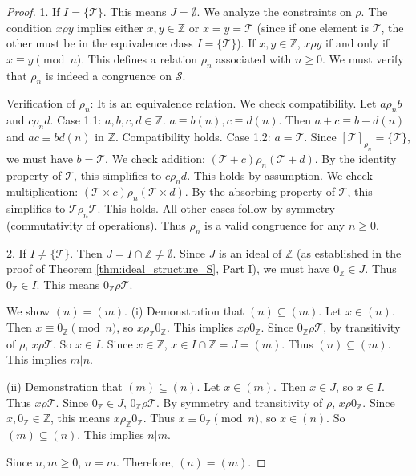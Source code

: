 \documentclass[11pt, a4paper]{article}
\theoremstyle{plain}
\theoremstyle{definition}
\numberwithin{equation}{section}
\newcommand{\Z}{\mathbb{Z}}
\newcommand{\Tobj}{\mathcal{T}} %
\newcommand{\SemiringS}{\mathcal{S}}
\begin{document}
\begin{proof}
1. If $I=\{\Tobj\}$. This means $J=\emptyset$. We analyze the constraints on $\rho$. The condition $x \rho y$ implies either $x, y \in \Z$ or $x=y=\Tobj$ (since if one element is $\Tobj$, the other must be in the equivalence class $I=\{\Tobj\}$). If $x, y \in \Z$, $x \rho y$ if and only if $x \equiv y \pmod{n}$. This defines a relation $\rho_n$ associated with $n\ge 0$. We must verify that $\rho_n$ is indeed a congruence on $\SemiringS$.

Verification of $\rho_n$: It is an equivalence relation. We check compatibility. Let $a \rho_n b$ and $c \rho_n d$.
Case 1.1: $a, b, c, d \in \Z$. $a\equiv b(n), c\equiv d(n)$. Then $a+c \equiv b+d(n)$ and $ac \equiv bd(n)$ in $\Z$. Compatibility holds.
Case 1.2: $a=\Tobj$. Since $[\Tobj]_{\rho_n}=\{\Tobj\}$, we must have $b=\Tobj$.
We check addition: $(\Tobj+c) \rho_n (\Tobj+d)$. By the identity property of $\Tobj$, this simplifies to $c \rho_n d$. This holds by assumption.
We check multiplication: $(\Tobj\times c) \rho_n (\Tobj\times d)$. By the absorbing property of $\Tobj$, this simplifies to $\Tobj \rho_n \Tobj$. This holds.
All other cases follow by symmetry (commutativity of operations). Thus $\rho_n$ is a valid congruence for any $n\ge 0$.

2. If $I\neq\{\Tobj\}$. Then $J=I\cap\Z \neq \emptyset$. Since $J$ is an ideal of $\Z$ (as established in the proof of Theorem \ref{thm:ideal_structure_S}, Part I), we must have $0_{\Z} \in J$. Thus $0_{\Z} \in I$. This means $0_{\Z} \rho \Tobj$.

We show $(n)=(m)$.
(i) Demonstration that $(n) \subseteq (m)$. Let $x \in (n)$. Then $x \equiv 0_{\Z} \pmod{n}$, so $x \rho_{\Z} 0_{\Z}$. This implies $x \rho 0_{\Z}$. Since $0_{\Z} \rho \Tobj$, by transitivity of $\rho$, $x \rho \Tobj$. So $x \in I$. Since $x \in \Z$, $x \in I \cap \Z = J=(m)$. Thus $(n) \subseteq (m)$. This implies $m|n$.

(ii) Demonstration that $(m) \subseteq (n)$. Let $x \in (m)$. Then $x \in J$, so $x \in I$. Thus $x \rho \Tobj$. Since $0_{\Z} \in J$, $0_{\Z} \rho \Tobj$. By symmetry and transitivity of $\rho$, $x \rho 0_{\Z}$. Since $x, 0_{\Z} \in \Z$, this means $x \rho_{\Z} 0_{\Z}$. Thus $x \equiv 0_{\Z} \pmod{n}$, so $x \in (n)$. So $(m) \subseteq (n)$. This implies $n|m$.

Since $n, m \ge 0$, $n=m$. Therefore, $(n)=(m)$.
\end{proof}
\end{document}
